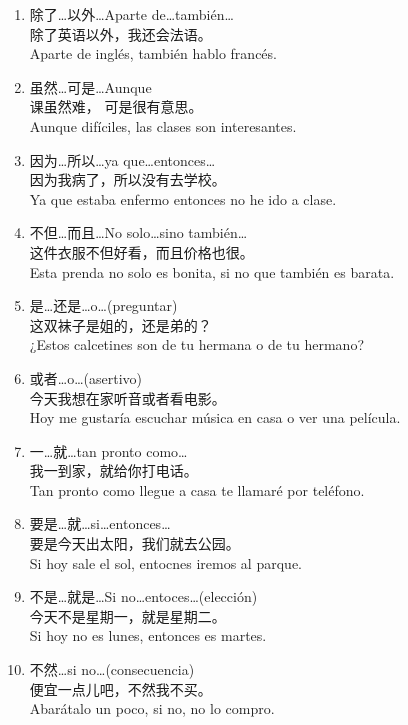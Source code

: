 \documentclass[13pt]{article}
\begin{document}

\begin{CJK*}{UTF8}{gkai}
\begin{pinyinscope}
\LARGE
\begin{enumerate}
	\item 除了\ldots 以外\ldots \qquad Aparte de\ldots también\ldots\\
	除了英语以外，我还会法语。\\
	Aparte de inglés, también hablo francés.
	\item 虽然\ldots 可是\ldots \qquad Aunque\\
	课虽然难， 可是很有意思。\\
	Aunque difíciles, las clases son interesantes.
	\item 因为\ldots 所以\ldots \qquad ya que\ldots entonces\ldots\\
	因为我病了，所以没有去学校。\\
	Ya que estaba enfermo entonces no he ido a clase.
	\item 不但\ldots 而且\ldots \qquad No solo\ldots sino también\ldots\\
	这件衣服不但好看，而且价格也很。\\
	Esta prenda no solo es bonita, si no que también es barata.
	\item 是\ldots 还是\ldots  \qquad o\ldots (preguntar)\\
	这双袜子是姐的，还是弟的？\\
	¿Estos calcetines son de tu hermana o de tu hermano?
	\item 或者\ldots  \qquad o\ldots (asertivo)\\
	今天我想在家听音或者看电影。\\
	Hoy me gustaría escuchar música en casa o ver una película.
	\item 一\ldots 就\ldots  \qquad tan pronto como\ldots\\
	我一到家，就给你打电话。\\
	Tan pronto como llegue a casa te llamaré por teléfono.
	\item 要是\ldots 就\ldots  \qquad si\ldots entonces\ldots\\
	要是今天出太阳，我们就去公园。\\
	Si hoy sale el sol, entocnes iremos al parque.
	\item 不是\ldots 就是\ldots  \qquad Si no\ldots entoces\ldots (elección)\\
	今天不是星期一，就是星期二。\\
	Si hoy no es lunes, entonces es martes.
	\item 不然\ldots  \qquad si no\ldots (consecuencia)\\
	便宜一点儿吧，不然我不买。\\
	Abarátalo un poco, si no, no lo compro.
\end{enumerate}

\end{pinyinscope}
\end{CJK*}
\end{document}

